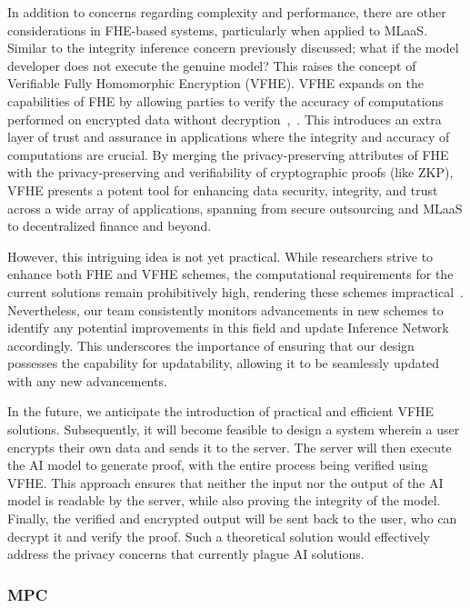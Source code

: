 \documentclass[conference]{IEEEtran}
\begin{document}
In addition to concerns regarding complexity and performance, there are other considerations in FHE-based systems, particularly when applied to MLaaS. Similar to the integrity inference concern previously discussed; what if the model developer does not execute the genuine model? This raises the concept of Verifiable Fully Homomorphic Encryption (VFHE). VFHE expands on the capabilities of FHE by allowing parties to verify the accuracy of computations performed on encrypted data without decryption~\cite{Viand2023VerifiableFH},~\cite{Chatel2022VerifiableEF}. This introduces an extra layer of trust and assurance in applications where the integrity and accuracy of computations are crucial. By merging the privacy-preserving attributes of FHE with the privacy-preserving and verifiability of cryptographic proofs (like ZKP), VFHE presents a potent tool for enhancing data security, integrity, and trust across a wide array of applications, spanning from secure outsourcing and MLaaS to decentralized finance and beyond.

However, this intriguing idea is not yet practical. While researchers strive to enhance both FHE and VFHE schemes, the computational requirements for the current solutions remain prohibitively high, rendering these schemes impractical~\cite{Atapoor2024VerifiableFV}. Nevertheless, our team consistently monitors advancements in new schemes to identify any potential improvements in this field and update Inference Network accordingly. This underscores the importance of ensuring that our design possesses the capability for updatability, allowing it to be seamlessly updated with any new advancements.

In the future, we anticipate the introduction of practical and efficient VFHE solutions. Subsequently, it will become feasible to design a system wherein a user encrypts their own data and sends it to the server. The server will then execute the AI model to generate proof, with the entire process being verified using VFHE. This approach ensures that neither the input nor the output of the AI model is readable by the server, while also proving the integrity of the model. Finally, the verified and encrypted output will be sent back to the user, who can decrypt it and verify the proof. Such a theoretical solution would effectively address the privacy concerns that currently plague AI solutions.


\subsubsection{MPC}
\end{document}
